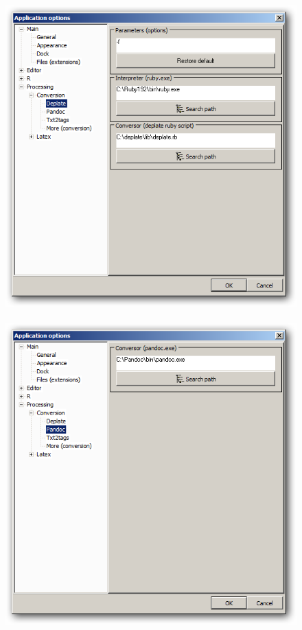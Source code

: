 \begin{figure}[h!]
  \includegraphics[scale=0.35]{./res/app_processing_conversion_deplate.png}~~
  \includegraphics[scale=0.35]{./res/app_processing_conversion_pandoc.png}\\

\end{figure}

